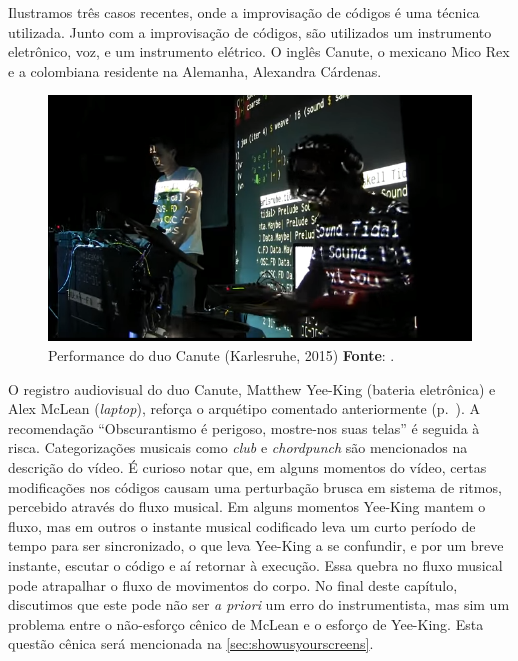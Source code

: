 Ilustramos três casos recentes, onde a improvisação de códigos é uma técnica utilizada. Junto com a improvisação de códigos, são utilizados um instrumento eletrônico, voz, e um instrumento elétrico. O inglês Canute, o mexicano Mico Rex e a colombiana residente na Alemanha, Alexandra Cárdenas.

\begin{figure}[!h]
  \centering
  \includegraphics[scale=0.71]{imagens/canute.png}
  \caption{Performance do duo Canute (Karlesruhe, 2015) \textbf{Fonte}: .}
  \label{fig:canute}
\end{figure}

O registro audiovisual do duo Canute, Matthew Yee-King (bateria eletrônica) e Alex McLean (\emph{laptop}), reforça o arquétipo comentado anteriormente (p.~\pageref{fig:weaving}). A recomendação ``Obscurantismo é perigoso, mostre-nos suas telas'' é seguida à risca. Categorizações musicais como \emph{club} e \emph{chordpunch} são mencionados na descrição do vídeo. É curioso notar que, em alguns momentos do vídeo, certas modificações nos códigos causam uma perturbação brusca em sistema de ritmos, percebido através do fluxo musical. Em alguns momentos Yee-King mantem o fluxo, mas em outros o instante musical codificado leva um curto período de tempo para ser sincronizado, o que leva Yee-King a se confundir, e por um breve instante, escutar o código e aí retornar à execução. Essa quebra no fluxo musical pode atrapalhar o fluxo de movimentos do corpo. No final deste capítulo, discutimos que este pode não ser \emph{a priori} um erro do instrumentista, mas sim um problema entre o não-esforço cênico de McLean e o esforço de Yee-King. Esta questão cênica será mencionada na \autoref{sec:showusyourscreens}.

